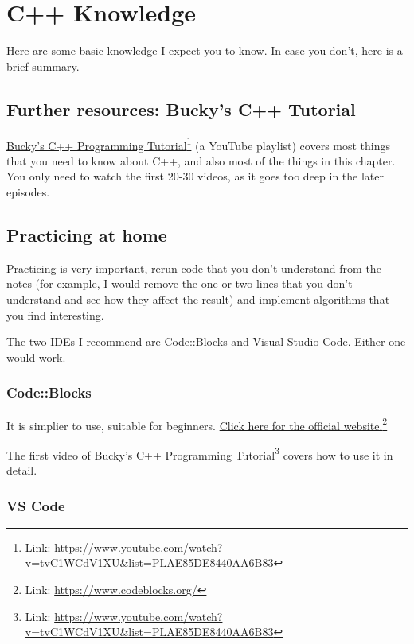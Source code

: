 \chapter{C++ Knowledge}

Here are some basic knowledge I expect you to know. In case you don't, here is a brief summary.

\section{Further resources: Bucky's C++ Tutorial}
\href{https://www.youtube.com/watch?v=tvC1WCdV1XU&list=PLAE85DE8440AA6B83}{Bucky's C++ Programming Tutorial}\footnote{Link: \href{https://www.youtube.com/watch?v=tvC1WCdV1XU&list=PLAE85DE8440AA6B83}{https://www.youtube.com/watch?v=tvC1WCdV1XU\&list=PLAE85DE8440AA6B83}} (a YouTube playlist) covers most things that you need to know about C++, and also most of the things in this chapter. You only need to watch the first 20-30 videos, as it goes too deep in the later episodes.

\section{Practicing at home}
Practicing is very important, rerun code that you don't understand from the notes (for example, I would remove the one or two lines that you don't understand and see how they affect the result) and implement algorithms that you find interesting. 

The two IDEs I recommend are Code::Blocks and Visual Studio Code. Either one would work.

\subsection*{Code::Blocks}

It is simplier to use, suitable for beginners. \href{https://www.codeblocks.org/}{Click here for the official website.}\footnote{Link: \href{https://www.codeblocks.org/}{https://www.codeblocks.org/}}

The first video of \href{https://www.youtube.com/watch?v=tvC1WCdV1XU&list=PLAE85DE8440AA6B83}{Bucky's C++ Programming Tutorial}\footnote{Link: \href{https://www.youtube.com/watch?v=tvC1WCdV1XU&list=PLAE85DE8440AA6B83}{https://www.youtube.com/watch?v=tvC1WCdV1XU\&list=PLAE85DE8440AA6B83}} covers how to use it in detail.

\subsection*{VS Code}

